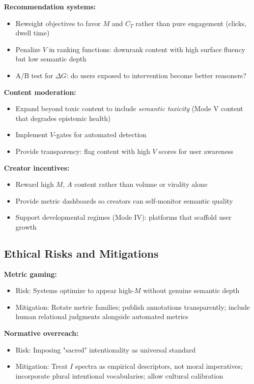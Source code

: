 \documentclass[12pt]{article}
\begin{document}
\textbf{Recommendation systems:}
\begin{itemize}
\item Reweight objectives to favor $M$ and $C_T$ rather than pure engagement (clicks, dwell time)
\item Penalize $V$ in ranking functions: downrank content with high surface fluency but low semantic depth
\item A/B test for $\Delta G$: do users exposed to intervention become better reasoners?
\end{itemize}

\textbf{Content moderation:}
\begin{itemize}
\item Expand beyond toxic content to include \textit{semantic toxicity} (Mode V content that degrades epistemic health)
\item Implement $V$-gates for automated detection
\item Provide transparency: flag content with high $V$ scores for user awareness
\end{itemize}

\textbf{Creator incentives:}
\begin{itemize}
\item Reward high $M$, $A$ content rather than volume or virality alone
\item Provide metric dashboards so creators can self-monitor semantic quality
\item Support developmental regimes (Mode IV): platforms that scaffold user growth
\end{itemize}

\subsection{Ethical Risks and Mitigations}

\textbf{Metric gaming:}
\begin{itemize}
\item Risk: Systems optimize to appear high-$M$ without genuine semantic depth
\item Mitigation: Rotate metric families; publish annotations transparently; include human relational judgments alongside automated metrics
\end{itemize}

\textbf{Normative overreach:}
\begin{itemize}
\item Risk: Imposing "sacred" intentionality as universal standard
\item Mitigation: Treat $I$ spectra as empirical descriptors, not moral imperatives; incorporate plural intentional vocabularies; allow cultural calibration
\end{itemize}
\end{document}
